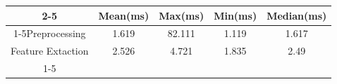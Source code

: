 \documentclass{standalone}
\begin{document}
 
 \begin{tabular}{|c |c |c |c |c |}
\cline{2-5}\cline{2-5} \multicolumn{1}{c |}{ } & Mean(ms) & Max(ms) & Min(ms) & Median(ms)\\ 
\cline{1-5}Preprocessing & 1.619 & 82.111 & 1.119 & 1.617\\ 
 \hhline{|=|=|=|=|=|}Feature Extaction & 2.526 & 4.721 & 1.835 & 2.49\\ 
 \cline{1-5}\hline \end{tabular}
 
\end{document}
